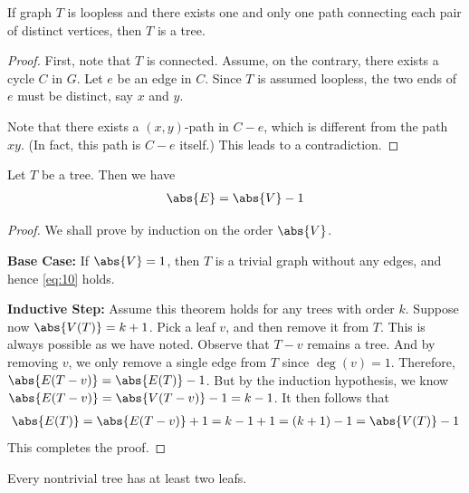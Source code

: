 \documentclass[thmcnt=section, 12pt, color=cyan]{my-elegantbook}
\begin{document}
\begin{theorem} \label{thm:3}
    If graph $T$ is loopless and 
	there exists one and only one path 
	connecting each pair of distinct vertices,
	then $T$ is a tree.
\end{theorem}

\begin{proof}
    First, note that $T$ is connected.
	Assume, on the contrary, 
	there exists a cycle $C$ in  $G$.
	Let  $e$ be an edge in  $C$.
	Since  $T$ is assumed loopless, 
	the two ends of  $e$ must be distinct, say  $x$ and $y$.

	Note that there exists a $(x,y)$-path in  $C - e$,
	which is different from the path $xy$. 
	(In fact, this path is $C-e$ itself.) 
	This leads to a contradiction.
\end{proof}


\begin{theorem} \label{thm:4}
    Let $T$ be a tree. Then we have 
	\begin{align}
		\abs{E} = \abs{V} - 1
		\label{eq:10}
	\end{align}
\end{theorem}

\begin{proof}
	We shall prove by induction on the order $\abs{V}$.

	\noindent\textbf{Base Case:} If $\abs{V} = 1$, 
	then $T$ is a trivial graph without any edges, 
	and hence \eqref{eq:10} holds.

	\noindent\textbf{Inductive Step:} Assume this theorem 
	holds for any trees with order $k$.
	Suppose now $\abs{V(T)} = k+1$.
	Pick a leaf $v$, and then remove it from $T$.
	This is always possible as we have noted.
	Observe that  $T - v$ remains a tree.
	And by removing $v$, 
	we only remove a single edge from  $T$ since  $\deg(v) = 1$.
	Therefore, $\abs{E(T-v)} = \abs{E(T)} - 1$.
	But by the induction hypothesis, 
	we know $\abs{E(T-v)} = \abs{V(T-v)} - 1 = k - 1$. 
	It then follows that 
	 \begin{align*}
		 \abs{E(T)} = \abs{E(T-v)} + 1 
		 = k-1+1
		 = (k+1)-1 
		 = \abs{V(T)} - 1
	\end{align*}
	This completes the proof.
\end{proof}


\begin{corollary} \label{cor:1}
	Every nontrivial tree has at least two leafs.
\end{corollary}
\end{document}
